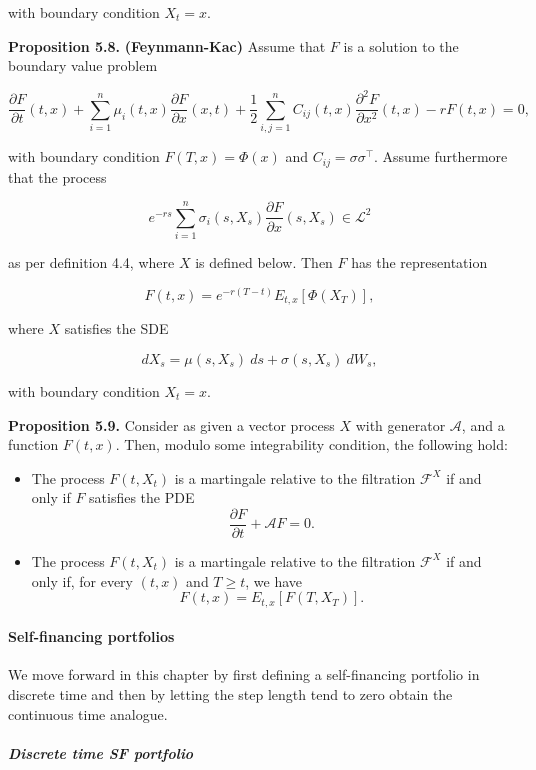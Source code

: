 \documentclass[
]{article}
\providecommand{\tightlist}{%
  \setlength{\itemsep}{0pt}\setlength{\parskip}{0pt}}
\begin{document}
with boundary condition \(X_t=x\).

\textbf{Proposition 5.8.} \textbf{(Feynmann-Kac)} Assume that \(F\) is a
solution to the boundary value problem

\[
\frac{\partial F}{\partial t}(t,x)+\sum_{i=1}^n\mu_i(t,x)\frac{\partial F}{\partial x}(x,t)+\frac{1}{2}\sum_{i,j=1}^n C_{ij}(t,x)\frac{\partial^2 F}{\partial x^2}(t,x)-rF(t,x)=0,
\]

with boundary condition \(F(T,x)=\Phi(x)\) and
\(C_{ij}=\sigma \sigma^\top\). Assume furthermore that the process

\[
e^{-rs}\sum_{i=1}^n\sigma_i(s,X_s)\frac{\partial F}{\partial x}(s,X_s) \in \mathcal{L}^2
\]

as per definition 4.4, where \(X\) is defined below. Then \(F\) has the
representation

\[
F(t,x)=e^{-r(T-t)}E_{t,x}[\Phi(X_T)],
\]

where \(X\) satisfies the SDE

\[
dX_s=\mu(s,X_s)\ ds+\sigma(s,X_s)\ dW_s,
\]

with boundary condition \(X_t=x\).

\textbf{Proposition 5.9.} Consider as given a vector process \(X\) with
generator \(\mathcal{A}\), and a function \(F(t,x)\). Then, modulo some
integrability condition, the following hold:

\begin{itemize}
\tightlist
\item
  The process \(F(t,X_t)\) is a martingale relative to the filtration
  \(\mathcal{F}^X\) if and only if \(F\) satisfies the PDE \[
    \frac{\partial F}{\partial t}+\mathcal{A}F=0.
    \]
\item
  The process \(F(t,X_t)\) is a martingale relative to the filtration
  \(\mathcal{F}^X\) if and only if, for every \((t,x)\) and \(T\ge t\),
  we have \[
    F(t,x)=E_{t,x}[F(T,X_T)].
    \]
\end{itemize}

\hypertarget{self-financing-portfolios}{%
\paragraph{Self-financing portfolios}\label{self-financing-portfolios}}

We move forward in this chapter by first defining a self-financing
portfolio in discrete time and then by letting the step length tend to
zero obtain the continuous time analogue.

\hypertarget{discrete-time-sf-portfolio}{%
\subparagraph{Discrete time SF
portfolio}\label{discrete-time-sf-portfolio}}
\end{document}

